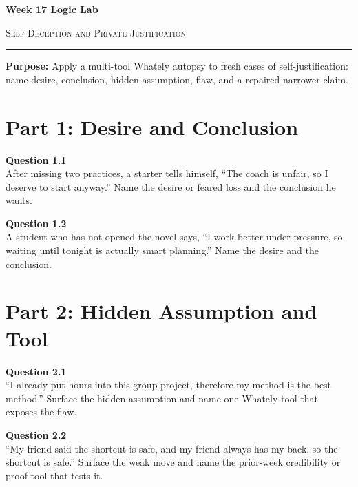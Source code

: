 \documentclass[12pt]{article}
\begin{document}
\begin{center}
{\LARGE\bfseries Week 17 Logic Lab}\par\vspace{0.05em}
{\large\scshape Self-Deception and Private Justification}\par\vspace{0.1em}
\rule{0.78\textwidth}{0.5pt}\par\vspace{0.15em}
\end{center}

\noindent\textbf{Purpose:} Apply a multi-tool Whately autopsy to fresh cases of self-justification: name desire, conclusion, hidden assumption, flaw, and a repaired narrower claim.

\vspace{0.3em}

\section*{Part 1: Desire and Conclusion}

\textbf{Question 1.1}\\[-0.15em]
After missing two practices, a starter tells himself, ``The coach is unfair, so I deserve to start anyway.'' Name the desire or feared loss and the conclusion he wants.


\textbf{Question 1.2}\\[-0.15em]
A student who has not opened the novel says, ``I work better under pressure, so waiting until tonight is actually smart planning.'' Name the desire and the conclusion.


\newpage

\section*{Part 2: Hidden Assumption and Tool}

\textbf{Question 2.1}\\[-0.15em]
``I already put hours into this group project, therefore my method is the best method.'' Surface the hidden assumption and name one Whately tool that exposes the flaw.


\textbf{Question 2.2}\\[-0.15em]
``My friend said the shortcut is safe, and my friend always has my back, so the shortcut is safe.'' Surface the weak move and name the prior-week credibility or proof tool that tests it.
\end{document}
